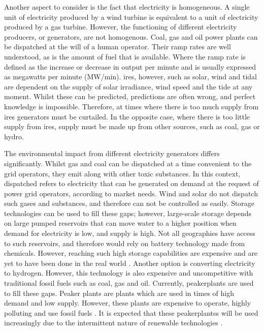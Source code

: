 Another aspect to consider is the fact that electricity is homogeneous. A single unit of electricity produced by a wind turbine is equivalent to a unit of electricity produced by a gas turbine. However, the functioning of different electricity producers, or generators, are not homogenous. Coal, gas and oil power plants can be \gls{dispatched} at the will of a human operator. Their ramp rates are well understood, as is the amount of fuel that is available. Where the ramp rate is defined as the increase or decrease in output per minute and is usually expressed as megawatts per minute (MW/min). \acrfull{ires}, however, such as solar, wind and tidal are dependent on the supply of solar irradiance, wind speed and the tide at any moment. Whilst these can be predicted, predictions are often wrong, and perfect knowledge is impossible. Therefore, at times where there is too much supply from \Gls{ires} generators must be curtailed. In the opposite case, where there is too little supply from \acrshort{ires}, supply must be made up from other sources, such as coal, gas or hydro.

The environmental impact from different electricity generators differs significantly. Whilst gas and coal can be dispatched at a time convenient to the grid operators, they emit  along with other toxic substances. In this context, dispatched refers to electricity that can be generated on demand at the request of power grid operators, according to market needs. Wind and solar do not dispatch such gases and substances, and therefore can not be controlled as easily. Storage technologies can be used to fill these gaps; however, large-scale storage depends on large pumped reservoirs that can move water to a higher position when demand for electricity is low, and supply is high. Not all geographies have access to such reservoirs, and therefore would rely on battery technology made from chemicals. However, reaching such high storage capabilities are expensive and are yet to have been done in the real world \cite{cole2019cost}. Another option is converting electricity to hydrogen. However, this technology is also expensive and uncompetitive with traditional fossil fuels such as coal, gas and oil. Currently, \gls{peakerplants} are used to fill these gaps. Peaker plants are plants which are used in times of high demand and low supply. However, these plants are expensive to operate, highly polluting and use fossil fuels \cite{lin2011energy}. It is expected that these \gls{peakerplants}s will be used increasingly due to the intermittent nature of renewable technologies \cite{lin2011energy}. 


